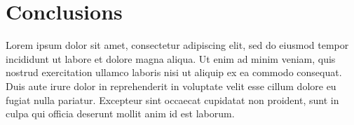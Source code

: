 \documentclass[12pt, a4paper]{article} %
\begin{document}

\section{Conclusions}

Lorem ipsum dolor sit amet, consectetur adipiscing elit, sed do eiusmod tempor incididunt ut labore et dolore magna aliqua. Ut enim ad minim veniam, quis nostrud exercitation ullamco laboris nisi ut aliquip ex ea commodo consequat. Duis aute irure dolor in reprehenderit in voluptate velit esse cillum dolore eu fugiat nulla pariatur. Excepteur sint occaecat cupidatat non proident, sunt in culpa qui officia deserunt mollit anim id est laborum.




\newpage

\end{document}
